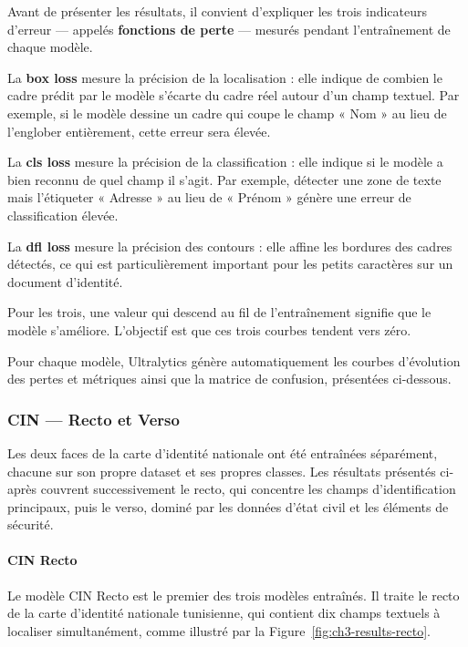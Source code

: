 \medskip
\noindent Avant de présenter les résultats, il convient d'expliquer les trois indicateurs d'erreur --- appelés \textbf{fonctions de perte} --- mesurés pendant l'entraînement de chaque modèle.

\medskip
\noindent La \textbf{box loss} mesure la précision de la localisation : elle indique de combien le cadre prédit par le modèle s'écarte du cadre réel autour d'un champ textuel. Par exemple, si le modèle dessine un cadre qui coupe le champ « Nom » au lieu de l'englober entièrement, cette erreur sera élevée.

\medskip
\noindent La \textbf{cls loss} mesure la précision de la classification : elle indique si le modèle a bien reconnu de quel champ il s'agit. Par exemple, détecter une zone de texte mais l'étiqueter « Adresse » au lieu de « Prénom » génère une erreur de classification élevée.

\medskip
\noindent La \textbf{dfl loss} mesure la précision des contours : elle affine les bordures des cadres détectés, ce qui est particulièrement important pour les petits caractères sur un document d'identité.

\medskip
\noindent Pour les trois, une valeur qui descend au fil de l'entraînement signifie que le modèle s'améliore. L'objectif est que ces trois courbes tendent vers zéro.

\medskip
\noindent Pour chaque modèle, Ultralytics génère automatiquement les courbes d'évolution des pertes et métriques ainsi que la matrice de confusion, présentées ci-dessous.

\subsubsection{CIN --- Recto et Verso}

Les deux faces de la carte d'identité nationale ont été entraînées séparément, chacune sur son propre dataset et ses propres classes. Les résultats présentés ci-après couvrent successivement le recto, qui concentre les champs d'identification principaux, puis le verso, dominé par les données d'état civil et les éléments de sécurité.

\paragraph{CIN Recto}
Le modèle CIN Recto est le premier des trois modèles entraînés. Il traite le recto de la carte d'identité nationale tunisienne, qui contient dix champs textuels à localiser simultanément, comme illustré par la Figure~\ref{fig:ch3-results-recto}.


